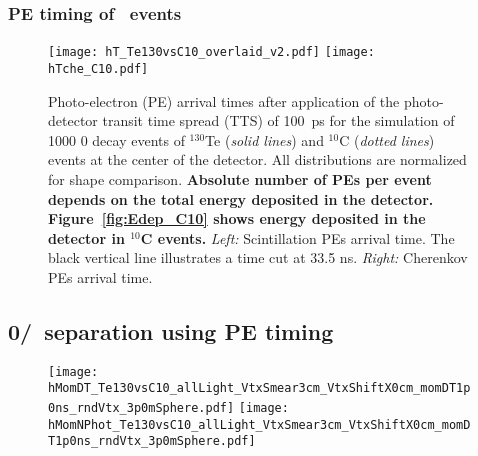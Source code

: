 \subsubsection{PE timing of \C~events}

\begin{figure}[h]
  \centering
  \texttt{[image: hT\_Te130vsC10\_overlaid\_v2.pdf]}
  \texttt{[image: hTche\_C10.pdf]}
  \caption{Photo-electron (PE) arrival times after application of the
    photo-detector transit time spread (TTS) of 100~ps for the
    simulation of 1000 0{\nbb} decay events of $^{130}$Te (\emph{solid
      lines}) and $^{10}$C (\emph{dotted lines}) events at the center
    of the detector. All distributions are normalized for shape
    comparison. {\bf Absolute number of PEs per event depends on the
      total energy deposited in the
      detector. Figure~\ref{fig:Edep_C10} shows energy deposited in
      the detector in $^{10}$C events.} \emph{Left:} Scintillation PEs
    arrival time. The black vertical line illustrates a time cut at
    33.5 ns. \emph{Right:} Cherenkov PEs arrival time.}
\label{fig:Arrival_time_C10}
\end{figure}




\subsection{0\nbb/\C~separation using PE timing}
\begin{figure}[h]
  \centering
  \texttt{[image: hMomDT\_Te130vsC10\_allLight\_VtxSmear3cm\_VtxShiftX0cm\_momDT1p0ns\_rndVtx\_3p0mSphere.pdf]}
  \texttt{[image: hMomNPhot\_Te130vsC10\_allLight\_VtxSmear3cm\_VtxShiftX0cm\_momDT1p0ns\_rndVtx\_3p0mSphere.pdf]}
  \caption{}
\label{fig:0nbb-C10_timing_separation}
\end{figure}

